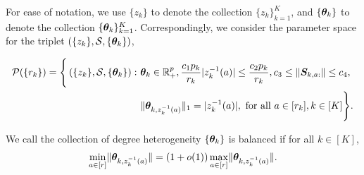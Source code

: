 \documentclass[lettersize,onecolumn,journal]{IEEEtran}
\theoremstyle{definition}
\theoremstyle{definition}
\newcommand{\of}[1]{\left(#1\right)}
\newcommand{\offf}[1]{\left\{#1\right\}}
\begin{document}
For ease of notation, we use $\{z_k\}$ to denote the collection $\{z_k\}_{k=1}^K$, and $\{\boldsymbol{\theta}_k\}$ to denote the collection $\{\boldsymbol{\theta}_k\}_{k=1}^K$. Correspondingly, we consider the parameter space for the triplet $\of{\{z_k\}, \tS, \{\mtheta_k\}}$,

\begin{align}
    \tP(\{r_k\}) = \Bigg\{ \of{\{z_k\}, \tS, \{\mtheta_k\}}:\  &\mtheta_k \in\mathbb{R}^p_{+}, {c_1 p_k\over r_k} |z_k^{-1}(a)| \leq {c_2 p_k\over r_k}, c_3 \leq  \onorm{\mS_{k,a:}} \leq c_4 ,\\
    &\onormSize{}{\mtheta_{k,z_k^{-1}(a)}}_1=|z_k^{-1}(a)|, \text{ for all } a \in [r_k], k\in[K]\Bigg\}. \label{eq:general_family}
\end{align}

We call the collection of degree heterogeneity $\{\boldsymbol{\theta}_k\}$ is balanced if for all $k \in [K]$,
\begin{equation}\label{eq:general_balanced}
    {\min_{a\in[r]} \onormSize{}{\mtheta_{k, z_k^{-1}(a)}}=\left(1+o(1)\right)\max_{a\in[r]}\onormSize{}{\mtheta_{k,z_k^{-1}(a)}}}.
\end{equation}
\end{document}
